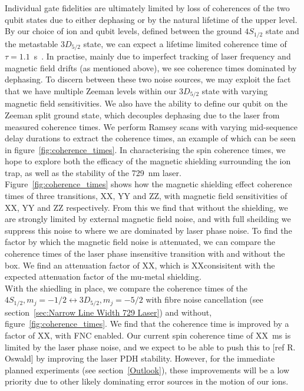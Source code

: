     Individual gate fidelities are ultimately limited by loss of coherences of
    the two qubit states due to either dephasing or by the natural lifetime of the upper level. By our choice of ion and qubit levels, defined between
    the ground $4S_{1/2}$ state and the metastable $3D_{5/2}$ state, we can
    expect a lifetime limited coherence time of $\tau = 1.1$~s~\cite{}. 
    In practise, mainly due to imperfect tracking of laser frequency and
    magnetic field drifts (as mentioned above), we see coherence times dominated
    by dephasing. To discern between these two noise sources, we may exploit the
    fact that we have multiple Zeeman levels within our $3D_{5/2}$ state with
    varying magnetic field sensitivities. We also have the ability to define our
    qubit on the Zeeman split ground state, which decouples dephasing due to the
    laser from measured coherence times. We perform Ramsey scans with varying
    mid-sequence delay durations to extract the coherence times, an example of
    which can be seen in figure~\ref{fig:coherence_times}. In characterising the
    spin coherence times, we hope to explore both the efficacy of the magnetic
    shielding surrounding the ion trap, as well as the stability of the 729~nm
    laser. \\
    Figure~\ref{fig:coherence_times} shows how the magnetic shielding effect
    coherence times of three transitions, XX, YY and ZZ, with magnetic field
    sensitivities of XX, YY and ZZ respectively.  From this we find that without
    the shielding, we are strongly limited by external magnetic field noise, and
    with full sheilding we suppress this noise to where we are dominated by
    laser phase noise. To find the factor by which the magnetic field noise is
    attenuated, we can compare the coherence times of the laser phase
    insensitive transition with and without the box. We find an attenuation
    factor of XX, which is XXconsisitent with the expected attenuation factor of
    the mu-metal shielding.\\
    With the shiedling in place, we compare the coherence times of the
    $4S_{1/2}, m_j = -1/2 \leftrightarrow 3D_{5/2}, m_j = -5/2$ with fibre noise cancellation (see
    section~\ref{sec:Narrow Line Width 729 Laser}) and without, figure~\ref{fig:coherence_times}. We find that the
    coherence time is improved by a factor of XX, with FNC enabled. Our current
    spin coherence time of XX~ms is limited by the laser phase noise, and we
    expect to be able to push this to [ref R. Oswald] by improving the laser PDH
    stability. However, for the immediate planned experiments (see
    section~\ref{Outlook}), these improvements will be a low priority due to
    other likely dominating error sources in the motion of our ions.\\

